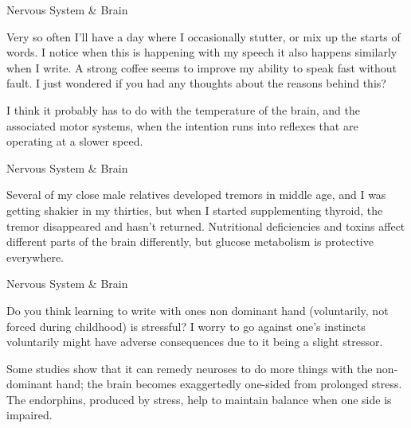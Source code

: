 \documentclass[11pt,oneside,openany,extrafontsizes]{memoir}
\begin{document}
\begin{qaexchange}{Nervous System \& Brain}

    \begin{question}
        Very so often I'll have a day where I occasionally stutter, or mix up the starts of words. I notice when this is happening with my speech it also happens similarly when I write. A strong coffee seems to improve my ability to speak fast without fault. I just wondered if you had any thoughts about the reasons behind this?
    \end{question}

    \begin{answer}
       I think it probably has to do with the temperature of the brain, and the associated motor systems, when the intention runs into reflexes that are operating at a slower speed. 
    \end{answer}
\end{qaexchange}

\begin{standalonequote}{Nervous System \& Brain}

    \begin{answer}
      Several of my close male relatives developed tremors in middle age, and I was getting shakier in my thirties, but when I started supplementing thyroid, the tremor disappeared and hasn't returned. Nutritional deficiencies and toxins affect different parts of the brain differently, but glucose metabolism is protective everywhere.
    \end{answer}
\end{standalonequote}

\begin{qaexchange}{Nervous System \& Brain}

    \begin{question}
         Do you think learning to write with ones non dominant hand (voluntarily, not forced during childhood) is stressful? I worry to go against one's instincts voluntarily might have adverse consequences due to it being a slight stressor.
    \end{question}

    \begin{answer}
      Some studies show that it can remedy neuroses to do more things with the non-dominant hand; the brain becomes exaggertedly one-sided from prolonged stress. The endorphins, produced by stress, help to maintain balance when one side is impaired.
    \end{answer}
\end{qaexchange}
\end{document}

